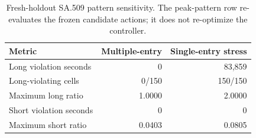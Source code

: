 \begin{table}[t]
\caption{Fresh-holdout SA.509 pattern sensitivity. The peak-pattern row re-evaluates the frozen candidate actions; it does not re-optimize the controller.}
\label{tab:sa509-sensitivity}
\centering
\footnotesize
\setlength{\tabcolsep}{3pt}
\renewcommand{\arraystretch}{1.07}
\begin{tabular}{@{}lrr@{}}
\toprule
Metric & Multiple-entry & Single-entry stress\\
\midrule
Long violation seconds & 0 & 83,859\\
Long-violating cells & 0/150 & 150/150\\
Maximum long ratio & 1.0000 & 2.0000\\
Short violation seconds & 0 & 0\\
Maximum short ratio & 0.0403 & 0.0805\\
\bottomrule
\end{tabular}
\end{table}
